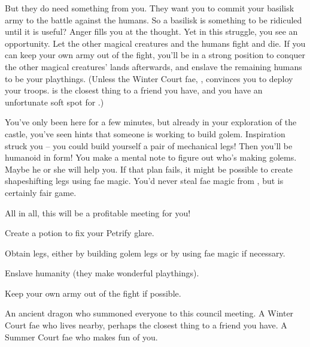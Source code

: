 \documentclass[char]{guildcamp2}
\begin{document}
But they do need something from you.  They want you to commit your basilisk army to the battle against the humans.  So a basilisk is something to be ridiculed until it is useful?  Anger fills you at the thought.  Yet in this struggle, you see an opportunity.  Let the other magical creatures and the humans fight and die.  If you can keep your own army out of the fight, you'll be in a strong position to conquer the other magical creatures' lands afterwards, and enslave the remaining humans to be your playthings.  (Unless the Winter Court fae, \cBabyFae{\intro}, convinces you to deploy your troops.  \cBabyFae{\They} is the closest thing to a friend you have, and you have an unfortunate soft spot for \cBabyFae{\them}.)

You've only been here for a few minutes, but already in your exploration of the castle, you've seen hints that someone is working to build golem.  Inspiration struck you -- you could build yourself a pair of mechanical legs!  Then you'll be humanoid in form!  You make a mental note to figure out who's making golems.  Maybe he or she will help you.  If that plan fails, it might be possible to create shapeshifting legs using fae magic.  You'd never steal fae magic from \cBabyFae{}, but \cTreeFae{} is certainly fair game.

All in all, this will be a profitable meeting for you!


\begin{itemz}[Goals]
  \item Create a potion to fix your Petrify glare.
  \item Obtain legs, either by building golem legs or by using fae magic if necessary.
  \item Enslave humanity (they make wonderful playthings).
  \item Keep your own army out of the fight if possible.
\end{itemz}

\begin{contacts}
  \contact{\cOnyx{}} An ancient dragon who summoned everyone to this council meeting.
  \contact{\cBabyFae{}} A Winter Court fae who lives nearby, perhaps the closest thing to a friend you have.
  \contact{\cTreeFae{}} A Summer Court fae who makes fun of you.
\end{contacts}
\end{document}
